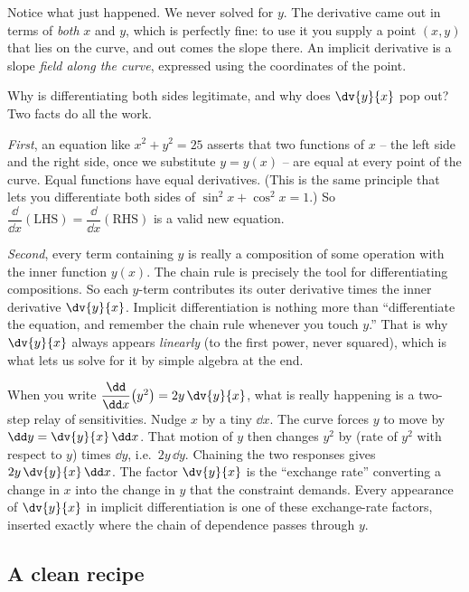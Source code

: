 Notice what just happened. We never solved for $y$. The derivative came out in terms of \emph{both}
$x$ and $y$, which is perfectly fine: to use it you supply a point $(x,y)$ that lies on the curve,
and out comes the slope there. An implicit derivative is a slope \emph{field along the curve},
expressed using the coordinates of the point.

\begin{whybox}
Why is differentiating both sides legitimate, and why does $\dv{y}{x}$ pop out? Two facts do all the
work.

\emph{First}, an equation like $x^2+y^2=25$ asserts that two functions of $x$ -- the left side and
the right side, once we substitute $y=y(x)$ -- are equal at every point of the curve. Equal
functions have equal derivatives. (This is the same principle that lets you differentiate both sides
of $\sin^2 x + \cos^2 x = 1$.) So $\dfrac{\dd}{\dd x}(\text{LHS}) = \dfrac{\dd}{\dd x}(\text{RHS})$ is
a valid new equation.

\emph{Second}, every term containing $y$ is really a composition of some operation with the inner
function $y(x)$. The chain rule is precisely the tool for differentiating compositions. So each
$y$-term contributes its outer derivative times the inner derivative $\dv{y}{x}$. Implicit
differentiation is nothing more than ``differentiate the equation, and remember the chain rule
whenever you touch $y$.'' That is why $\dv{y}{x}$ always appears \emph{linearly} (to the first
power, never squared), which is what lets us solve for it by simple algebra at the end.
\end{whybox}

\begin{happeningbox}
When you write $\dfrac{\dd}{\dd x}\!\left(y^2\right) = 2y\,\dv{y}{x}$, what is really happening is a
two-step relay of sensitivities. Nudge $x$ by a tiny $\dd x$. The curve forces $y$ to move by
$\dd y = \dv{y}{x}\,\dd x$. That motion of $y$ then changes $y^2$ by (rate of $y^2$ with respect to
$y$) times $\dd y$, i.e.\ $2y\,\dd y$. Chaining the two responses gives $2y\,\dv{y}{x}\,\dd x$. The
factor $\dv{y}{x}$ is the ``exchange rate'' converting a change in $x$ into the change in $y$ that
the constraint demands. Every appearance of $\dv{y}{x}$ in implicit differentiation is one of these
exchange-rate factors, inserted exactly where the chain of dependence passes through $y$.
\end{happeningbox}

\subsection{A clean recipe}

